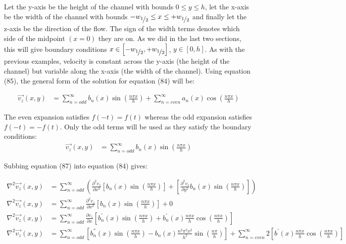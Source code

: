 \documentclass[titlepage]{article}
\begin{document}
\noindent Let the y-axis be the height of the channel with bounds $0\leq{y}\leq{h}$, let the x-axis be the width of the channel with bounds $-w_{\displaystyle\nicefrac{1}{2}}\leq{x}\leq{+w_{\displaystyle\nicefrac{1}{2}}}$ and finally let the z-axis be the direction of the flow. The sign of the width terms denotes which side of the midpoint $\left(x=0\right)$ they are on. As we did in the last two sections, this will give boundary conditions $x \in \left[-w_{\displaystyle\nicefrac{1}{2}}, +w_{\displaystyle\nicefrac{1}{2}}\right]$, $y\in\left[0,h\right]$. As with the previous examples, velocity is constant across the y-axis (the height of the channel) but variable along the x-axis (the width of the channel). Using equation (85), the general form of the solution for equation (84) will be:

\begin{align}
    \vec{v_{z}}\left(x,y\right) &= \sum_{n=odd}^{\infty}b_{n}\left(x\right)\sin(\displaystyle\frac{n\pi{x}}{h}) + \sum_{n=even}^{\infty}a_{n}\left(x\right)\cos(\displaystyle\frac{n\pi{x}}{h}) 
\end{align}

\noindent The even expansion satisfies $f\left(-t\right)=f\left(t\right)$ whereas the odd expansion satisfies $f\left(-t\right)=-f\left(t\right)$. Only the odd terms will be used as they satisfy the boundary conditions: 
\begin{align}
    \vec{v_{z}}\left(x,y\right) &= \sum_{n=odd}^{\infty}b_{n}\left(x\right)\sin(\displaystyle\frac{n\pi{x}}{h})
\end{align}

\newpage

Subbing equation (87) into equation (84) gives: 

\begin{align}
    \nabla^2\vec{v_{z}}\left(x,y\right) &= \sum_{n=odd}^{\infty}\left(\displaystyle\frac{\partial^2{v_{z}}}{\partial{x}^2}\left[b_{n}\left(x\right)\sin(\displaystyle\frac{n\pi{x}}{h})\right] + \left[\displaystyle\frac{\partial^2{v_{z}}}{\partial{y}^2} b_{n}\left(x\right)\sin(\displaystyle\frac{n\pi{x}}{h})\right]\right) \\ 
    \nabla^2\vec{v_{z}}\left(x,y\right) &= \sum_{n=odd}^{\infty}\displaystyle\frac{\partial^2{v_{z}}}{\partial{x}^2}\left[b_{n}\left(x\right)\sin(\displaystyle\frac{n\pi{x}}{h})\right] + 0 \\
    \nabla^2\vec{v_{z}}\left(x,y\right) &= \sum_{n=odd}^{\infty}\displaystyle\frac{\partial{v_{z}}}{\partial{x}}\left[b_{n}^{'}\left(x\right)\sin(\displaystyle\frac{n\pi{x}}{h})+b_{n}^{'}\left(x\right)\displaystyle\frac{n\pi{x}}{h}\cos(\displaystyle\frac{n\pi{x}}{h})\right] \\
    \nabla^2\vec{v_{z}}\left(x,y\right) &= \sum_{n=odd}^{\infty}\left[b_{n}^{''}\left(x\right)\sin(\displaystyle\frac{n\pi{x}}{h}) - b_{n}\left(x\right)\displaystyle\frac{n^{2}\pi^{2}x^{2}}{h^2}\sin(\displaystyle\frac{n\pi}{h})\right] + \sum_{n=even}^{\infty} 2\left[b^{'}\left(x\right)\displaystyle\frac{n\pi{x}}{h}\cos(\displaystyle\frac{n\pi{x}}{h})\right]
\end{align}
\end{document}
